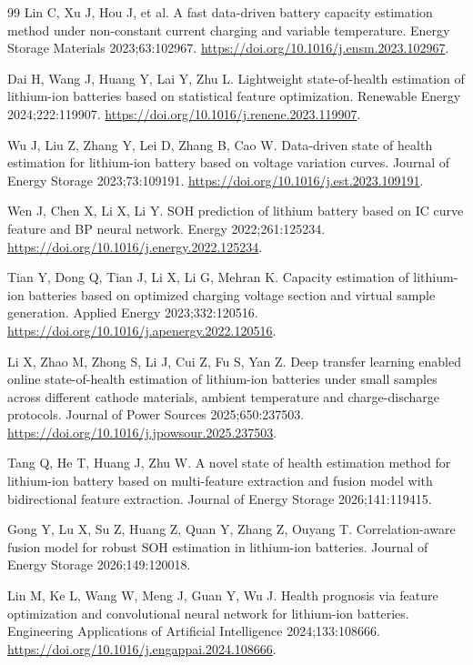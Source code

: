 \begin{thebibliography}{99}
 Lin C, Xu J, Hou J, et al. A fast data-driven battery capacity estimation method under non-constant current charging and variable temperature. Energy Storage Materials 2023;63:102967. \url{https://doi.org/10.1016/j.ensm.2023.102967}.

 Dai H, Wang J, Huang Y, Lai Y, Zhu L. Lightweight state-of-health estimation of lithium-ion batteries based on statistical feature optimization. Renewable Energy 2024;222:119907. \url{https://doi.org/10.1016/j.renene.2023.119907}.

 Wu J, Liu Z, Zhang Y, Lei D, Zhang B, Cao W. Data-driven state of health estimation for lithium-ion battery based on voltage variation curves. Journal of Energy Storage 2023;73:109191. \url{https://doi.org/10.1016/j.est.2023.109191}.

 Wen J, Chen X, Li X, Li Y. SOH prediction of lithium battery based on IC curve feature and BP neural network. Energy 2022;261:125234. \url{https://doi.org/10.1016/j.energy.2022.125234}.

 Tian Y, Dong Q, Tian J, Li X, Li G, Mehran K. Capacity estimation of lithium-ion batteries based on optimized charging voltage section and virtual sample generation. Applied Energy 2023;332:120516. \url{https://doi.org/10.1016/j.apenergy.2022.120516}.

 Li X, Zhao M, Zhong S, Li J, Cui Z, Fu S, Yan Z. Deep transfer learning enabled online state-of-health estimation of lithium-ion batteries under small samples across different cathode materials, ambient temperature and charge-discharge protocols. Journal of Power Sources 2025;650:237503. \url{https://doi.org/10.1016/j.jpowsour.2025.237503}.

 Tang Q, He T, Huang J, Zhu W. A novel state of health estimation method for lithium-ion battery based on multi-feature extraction and fusion model with bidirectional feature extraction. Journal of Energy Storage 2026;141:119415.

 Gong Y, Lu X, Su Z, Huang Z, Quan Y, Zhang Z, Ouyang T. Correlation-aware fusion model for robust SOH estimation in lithium-ion batteries. Journal of Energy Storage 2026;149:120018.

 Lin M, Ke L, Wang W, Meng J, Guan Y, Wu J. Health prognosis via feature optimization and convolutional neural network for lithium-ion batteries. Engineering Applications of Artificial Intelligence 2024;133:108666. \url{https://doi.org/10.1016/j.engappai.2024.108666}.


\end{thebibliography}
